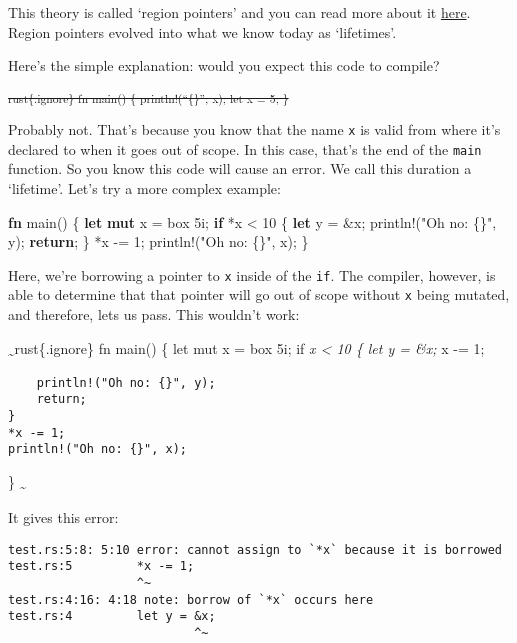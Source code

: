 \documentclass[]{article}
\newenvironment{Shaded}{}{}
\newcommand{\KeywordTok}[1]{\textcolor[rgb]{0.00,0.44,0.13}{\textbf{{#1}}}}
\newcommand{\DecValTok}[1]{\textcolor[rgb]{0.25,0.63,0.44}{{#1}}}
\newcommand{\StringTok}[1]{\textcolor[rgb]{0.25,0.44,0.63}{{#1}}}
\newcommand{\OtherTok}[1]{\textcolor[rgb]{0.00,0.44,0.13}{{#1}}}
\newcommand{\NormalTok}[1]{{#1}}
\begin{document}
This theory is called `region pointers' and you can read more about it
\href{http://www.cs.umd.edu/projects/cyclone/papers/cyclone-regions.pdf}{here}.
Region pointers evolved into what we know today as `lifetimes'.

Here's the simple explanation: would you expect this code to compile?

\textsubscript{\sout{rust\{.ignore\} fn main() \{ println!(``\{\}'', x);
let x = 5; \}}}

Probably not. That's because you know that the name \texttt{x} is valid
from where it's declared to when it goes out of scope. In this case,
that's the end of the \texttt{main} function. So you know this code will
cause an error. We call this duration a `lifetime'. Let's try a more
complex example:

\begin{Shaded}
\begin{Highlighting}[]
\KeywordTok{fn} \NormalTok{main() \{}
    \KeywordTok{let} \KeywordTok{mut} \NormalTok{x = box }\DecValTok{5i}\NormalTok{;}
    \KeywordTok{if} \NormalTok{*x < }\DecValTok{10} \NormalTok{\{}
        \KeywordTok{let} \NormalTok{y = &x;}
        \OtherTok{println!}\NormalTok{(}\StringTok{"Oh no: \{\}"}\NormalTok{, y);}
        \KeywordTok{return}\NormalTok{;}
    \NormalTok{\}}
    \NormalTok{*x -= }\DecValTok{1}\NormalTok{;}
    \OtherTok{println!}\NormalTok{(}\StringTok{"Oh no: \{\}"}\NormalTok{, x);}
\NormalTok{\}}
\end{Highlighting}
\end{Shaded}

Here, we're borrowing a pointer to \texttt{x} inside of the \texttt{if}.
The compiler, however, is able to determine that that pointer will go
out of scope without \texttt{x} being mutated, and therefore, lets us
pass. This wouldn't work:

\textsubscript{\textasciitilde{}}rust\{.ignore\} fn main() \{ let mut x
= box 5i; if \emph{x \textless{} 10 \{ let y = \&x; }x -= 1;

\begin{verbatim}
    println!("Oh no: {}", y);
    return;
}
*x -= 1;
println!("Oh no: {}", x);
\end{verbatim}

\} \textsubscript{\textasciitilde{}}

It gives this error:

\begin{verbatim}
test.rs:5:8: 5:10 error: cannot assign to `*x` because it is borrowed
test.rs:5         *x -= 1;
                  ^~
test.rs:4:16: 4:18 note: borrow of `*x` occurs here
test.rs:4         let y = &x;
                          ^~
\end{verbatim}
\end{document}

